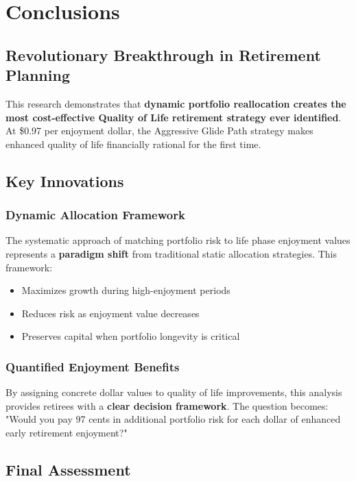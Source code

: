 \documentclass[11pt,letterpaper]{article}
\begin{document}
\section{Conclusions}

\subsection{Revolutionary Breakthrough in Retirement Planning}

This research demonstrates that \textbf{dynamic portfolio reallocation creates the most cost-effective Quality of Life retirement strategy ever identified}. At \$0.97 per enjoyment dollar, the Aggressive Glide Path strategy makes enhanced quality of life financially rational for the first time.

\subsection{Key Innovations}

\subsubsection{Dynamic Allocation Framework}
The systematic approach of matching portfolio risk to life phase enjoyment values represents a \textbf{paradigm shift} from traditional static allocation strategies. This framework:
\begin{itemize}[leftmargin=*]
    \item Maximizes growth during high-enjoyment periods
    \item Reduces risk as enjoyment value decreases
    \item Preserves capital when portfolio longevity is critical
\end{itemize}

\subsubsection{Quantified Enjoyment Benefits}
By assigning concrete dollar values to quality of life improvements, this analysis provides retirees with a \textbf{clear decision framework}. The question becomes: "Would you pay 97 cents in additional portfolio risk for each dollar of enhanced early retirement enjoyment?"

\subsection{Final Assessment}
\end{document}
